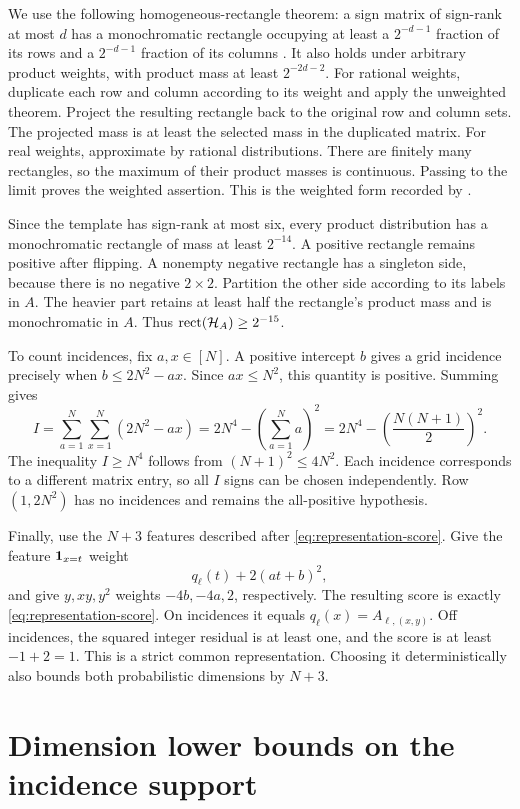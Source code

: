 We use the following homogeneous-rectangle theorem: a sign matrix of sign-rank at most $d$ has a monochromatic rectangle occupying at least a $2^{-d-1}$ fraction of its rows and a $2^{-d-1}$ fraction of its columns \citep{APP05}. It also holds under arbitrary product weights, with product mass at least $2^{-2d-2}$. For rational weights, duplicate each row and column according to its weight and apply the unweighted theorem. Project the resulting rectangle back to the original row and column sets. The projected mass is at least the selected mass in the duplicated matrix. For real weights, approximate by rational distributions. There are finitely many rectangles, so the maximum of their product masses is continuous. Passing to the limit proves the weighted assertion. This is the weighted form recorded by \citet[Theorem 1.9]{HHPTZ22}.

Since the template has sign-rank at most six, every product distribution has a monochromatic rectangle of mass at least $2^{-14}$. A positive rectangle remains positive after flipping. A nonempty negative rectangle has a singleton side, because there is no negative $2\times2$. Partition the other side according to its labels in $A$. The heavier part retains at least half the rectangle's product mass and is monochromatic in $A$. Thus $\operatorname{rect}(\mathcal H_A)\ge2^{-15}$.

To count incidences, fix $a,x\in[N]$. A positive intercept $b$ gives a grid incidence precisely when $b\le2N^2-ax$. Since $ax\le N^2$, this quantity is positive. Summing gives
\[
 I=\sum_{a=1}^{N}\sum_{x=1}^{N}(2N^2-ax)
 =2N^4-\left(\sum_{a=1}^{N}a\right)^2
 =2N^4-\left(\frac{N(N+1)}2\right)^2.
\]
The inequality $I\ge N^4$ follows from $(N+1)^2\le4N^2$. Each incidence corresponds to a different matrix entry, so all $I$ signs can be chosen independently. Row $(1,2N^2)$ has no incidences and remains the all-positive hypothesis.

Finally, use the $N+3$ features described after \eqref{eq:representation-score}. Give the feature $\mathbf 1_{x=t}$ weight
\[
 q_\ell(t)+2(at+b)^2,
\]
and give $y,xy,y^2$ weights $-4b,-4a,2$, respectively. The resulting score is exactly \eqref{eq:representation-score}. On incidences it equals $q_\ell(x)=A_{\ell,(x,y)}$. Off incidences, the squared integer residual is at least one, and the score is at least $-1+2=1$. This is a strict common representation. Choosing it deterministically also bounds both probabilistic dimensions by $N+3$.

\section{Dimension lower bounds on the incidence support}
\label{app:counting}

